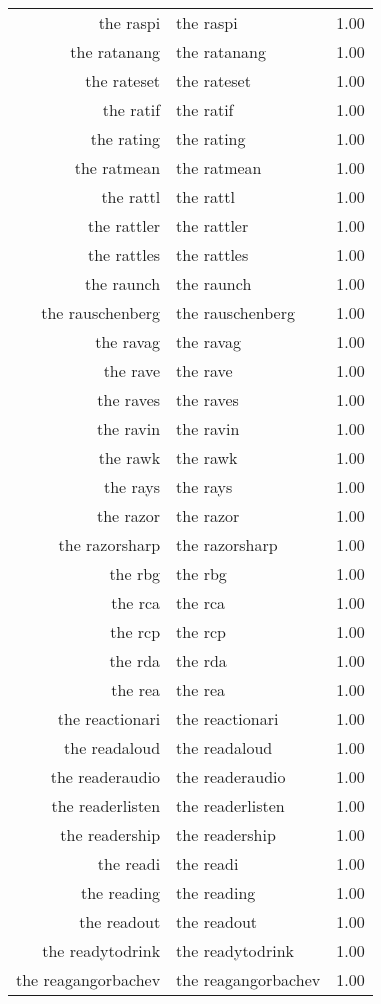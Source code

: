 \begin{table}[ht]
\begin{tabular}{rlr}
  the raspi & the raspi & 1.00 \\ 
  the ratanang & the ratanang & 1.00 \\ 
  the rateset & the rateset & 1.00 \\ 
  the ratif & the ratif & 1.00 \\ 
  the rating & the rating & 1.00 \\ 
  the ratmean & the ratmean & 1.00 \\ 
  the rattl & the rattl & 1.00 \\ 
  the rattler & the rattler & 1.00 \\ 
  the rattles & the rattles & 1.00 \\ 
  the raunch & the raunch & 1.00 \\ 
  the rauschenberg & the rauschenberg & 1.00 \\ 
  the ravag & the ravag & 1.00 \\ 
  the rave & the rave & 1.00 \\ 
  the raves & the raves & 1.00 \\ 
  the ravin & the ravin & 1.00 \\ 
  the rawk & the rawk & 1.00 \\ 
  the rays & the rays & 1.00 \\ 
  the razor & the razor & 1.00 \\ 
  the razorsharp & the razorsharp & 1.00 \\ 
  the rbg & the rbg & 1.00 \\ 
  the rca & the rca & 1.00 \\ 
  the rcp & the rcp & 1.00 \\ 
  the rda & the rda & 1.00 \\ 
  the rea & the rea & 1.00 \\ 
  the reactionari & the reactionari & 1.00 \\ 
  the readaloud & the readaloud & 1.00 \\ 
  the readeraudio & the readeraudio & 1.00 \\ 
  the readerlisten & the readerlisten & 1.00 \\ 
  the readership & the readership & 1.00 \\ 
  the readi & the readi & 1.00 \\ 
  the reading & the reading & 1.00 \\ 
  the readout & the readout & 1.00 \\ 
  the readytodrink & the readytodrink & 1.00 \\ 
  the reagangorbachev & the reagangorbachev & 1.00 \\ 

\end{tabular}
\end{table}
